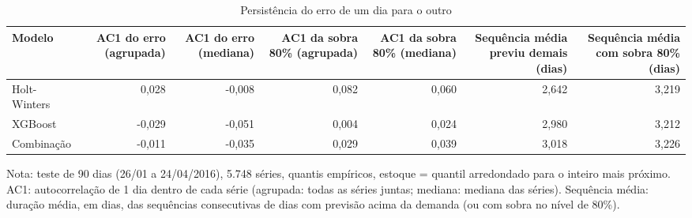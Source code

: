 \begin{table}[htbp]
\centering
\small
\caption{Persistência do erro de um dia para o outro}
\label{tab:mec_persistencia}
\begin{tabular}{lrrrrrr}
\toprule
Modelo & AC1 do erro (agrupada) & AC1 do erro (mediana) & AC1 da sobra 80\% (agrupada) & AC1 da sobra 80\% (mediana) & Sequência média previu demais (dias) & Sequência média com sobra 80\% (dias) \\
\midrule
Holt-Winters & 0,028 & -0,008 & 0,082 & 0,060 & 2,642 & 3,219 \\
XGBoost & -0,029 & -0,051 & 0,004 & 0,024 & 2,980 & 3,212 \\
Combinação & -0,011 & -0,035 & 0,029 & 0,039 & 3,018 & 3,226 \\
\bottomrule
\end{tabular}
\par\smallskip
{\footnotesize Nota: teste de 90 dias (26/01 a 24/04/2016), 5.748 séries, quantis empíricos, estoque = quantil arredondado para o inteiro mais próximo. AC1: autocorrelação de 1 dia dentro de cada série (agrupada: todas as séries juntas; mediana: mediana das séries). Sequência média: duração média, em dias, das sequências consecutivas de dias com previsão acima da demanda (ou com sobra no nível de 80\%).}
\end{table}
